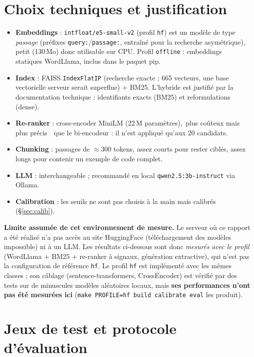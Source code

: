 \documentclass[11pt,a4paper]{article}
\providecommand{\og}{\guillemotleft\,}\providecommand{\fg}{\,\guillemotright}
\newcommand{\code}[1]{\texttt{\small #1}}
\begin{document}
\section{Choix techniques et justification}\label{sec:choix}
\begin{itemize}[leftmargin=*,itemsep=1pt]
\item \textbf{Embeddings} : \code{intfloat/e5-small-v2} (profil \code{hf}) est un mod\`ele de type \emph{passage} (pr\'efixes \code{query:}/\code{passage:}, entra\^in\'e pour la recherche asym\'etrique), petit (130\,Mo) donc utilisable sur CPU. Profil \code{offline} : embeddings statiques WordLlama, inclus dans le paquet pip.
\item \textbf{Index} : FAISS \code{IndexFlatIP} (recherche exacte ; 665 vecteurs, une base vectorielle serveur serait superflue) + BM25. L'hybride est justifi\'e par la documentation technique : identifiants exacts (BM25) et reformulations (dense).
\item \textbf{Re-ranker} : cross-encoder MiniLM (22\,M param\`etres), \og plus co\^uteux mais plus pr\'ecis \fg\ que le bi-encodeur : il n'est appliqu\'e qu'aux 20 candidats.
\item \textbf{Chunking} : passages de $\approx$300 tokens, assez courts pour rester cibl\'es, assez longs pour contenir un exemple de code complet.
\item \textbf{LLM} : interchangeable ; recommand\'e en local \code{qwen2.5:3b-instruct} via Ollama.
\item \textbf{Calibration} : les seuils ne sont pas choisis \`a la main mais calibr\'es (\S\ref{sec:calib}).
\end{itemize}
\textbf{Limite assum\'ee de cet environnement de mesure.} Le serveur o\`u ce rapport a \'et\'e r\'ealis\'e n'a pas acc\`es au site HuggingFace (t\'el\'echargement des mod\`eles impossible) ni \`a un LLM. Les r\'esultats ci-dessous sont donc \emph{mesur\'es avec le profil \code{\ProfileName}} (WordLlama + BM25 + re-ranker \`a signaux, g\'en\'eration extractive), qui n'est pas la configuration de r\'ef\'erence \code{hf}. Le profil \code{hf} est impl\'ement\'e avec les m\^emes classes ; son c\^ablage (sentence-transformers, CrossEncoder) est v\'erifi\'e par des tests sur de minuscules mod\`eles al\'eatoires locaux, mais \textbf{ses performances n'ont pas \'et\'e mesur\'ees ici} (\code{make PROFILE=hf build calibrate eval} les produit).

\section{Jeux de test et protocole d'\'evaluation}
\end{document}
